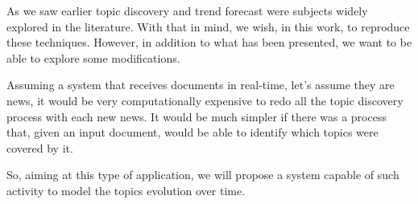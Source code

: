 As we saw earlier topic discovery and trend forecast were subjects widely explored in the literature. With that in mind, we wish, in this work, to reproduce these techniques. However, in addition to what has been presented, we want to be able to explore some modifications.

Assuming a system that receives documents in real-time, let's assume they are news, it would be very computationally expensive to redo all the topic discovery process with each new news. It would be much simpler if there was a process that, given an input document, would be able to identify 
which topics were covered by it.

So, aiming at this type of application, we will propose a system capable of such activity to model the topics evolution over time.


